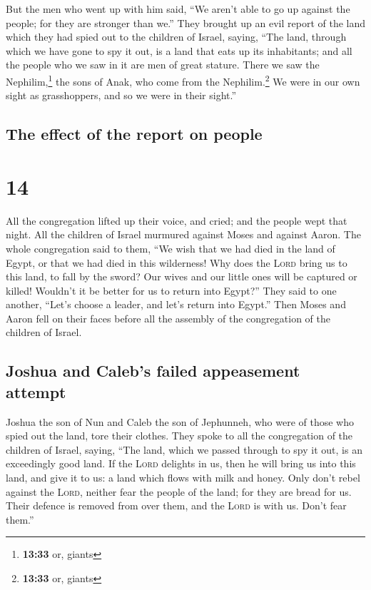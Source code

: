  But the men who went up with him said, ``We aren't able
to go up against the people; for they are stronger than we.''
 They brought up an evil report of the land which they
had spied out to the children of Israel, saying, ``The land, through
which we have gone to spy it out, is a land that eats up its
inhabitants; and all the people who we saw in it are men of great
stature.  There we saw the Nephilim,\footnote{\textbf{13:33}
  or, giants} the sons of Anak, who come from the Nephilim.\footnote{\textbf{13:33}
  or, giants} We were in our own sight as grasshoppers, and so we were
in their sight.''

\hypertarget{the-effect-of-the-report-on-people}{%
\subsection{The effect of the report on
people}\label{the-effect-of-the-report-on-people}}

\hypertarget{section-13}{%
\section{14}\label{section-13}}

 All the congregation lifted up their voice, and cried;
and the people wept that night.  All the children of
Israel murmured against Moses and against Aaron. The whole congregation
said to them, ``We wish that we had died in the land of Egypt, or that
we had died in this wilderness!  Why does the
\textsc{Lord} bring us to this land, to fall by the sword? Our wives and
our little ones will be captured or killed! Wouldn't it be better for us
to return into Egypt?''  They said to one another, ``Let's
choose a leader, and let's return into Egypt.''  Then
Moses and Aaron fell on their faces before all the assembly of the
congregation of the children of Israel.

\hypertarget{joshua-and-calebs-failed-appeasement-attempt}{%
\subsection{Joshua and Caleb's failed appeasement
attempt}\label{joshua-and-calebs-failed-appeasement-attempt}}

 Joshua the son of Nun and Caleb the son of Jephunneh, who
were of those who spied out the land, tore their clothes. 
They spoke to all the congregation of the children of Israel, saying,
``The land, which we passed through to spy it out, is an exceedingly
good land.  If the \textsc{Lord} delights in us, then he
will bring us into this land, and give it to us: a land which flows with
milk and honey.  Only don't rebel against the
\textsc{Lord}, neither fear the people of the land; for they are bread
for us. Their defence is removed from over them, and the \textsc{Lord}
is with us. Don't fear them.''

